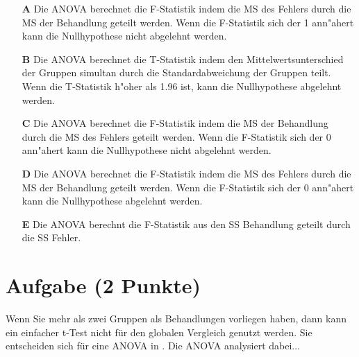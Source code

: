 \documentclass[a4paper, 9pt]{scrartcl}\usepackage[]{graphicx}\usepackage[]{xcolor}
\begin{document}
\begin{enumerate}
\item [\textbf{A} \msquare] Die ANOVA berechnet die F-Statistik indem die MS des Fehlers durch die MS der Behandlung geteilt werden. Wenn die F-Statistik sich der 1 ann{"a}hert kann die Nullhypothese nicht abgelehnt werden.
\item [\textbf{B} \msquare] Die ANOVA berechnet die T-Statistik indem den Mittelwertsunterschied der Gruppen simultan durch die Standardabweichung der Gruppen teilt. Wenn die T-Statistik h{"o}her als 1.96 ist, kann die Nullhypothese abgelehnt werden.
\item [\textbf{C} \msquare] Die ANOVA berechnet die F-Statistik indem die MS der Behandlung durch die MS des Fehlers geteilt werden. Wenn die F-Statistik sich der 0 ann{"a}hert kann die Nullhypothese nicht abgelehnt werden.
\item [\textbf{D} \msquare] Die ANOVA berechnet die F-Statistik indem die MS des Fehlers durch die MS der Behandlung geteilt werden. Wenn die F-Statistik sich der 0 ann{"a}hert kann die Nullhypothese abgelehnt werden.
\item [\textbf{E} \msquare] Die ANOVA berechnt die F-Statistik aus den SS Behandlung geteilt durch die SS Fehler.
\end{enumerate} 

\section{Aufgabe \hfill (2 Punkte)}




Wenn Sie mehr als zwei Gruppen als Behandlungen vorliegen haben, dann kann ein einfacher t-Test nicht für den globalen Vergleich genutzt werden. Sie entscheiden sich für eine ANOVA in \Rlogo. Die ANOVA analysiert dabei...
\end{document}
